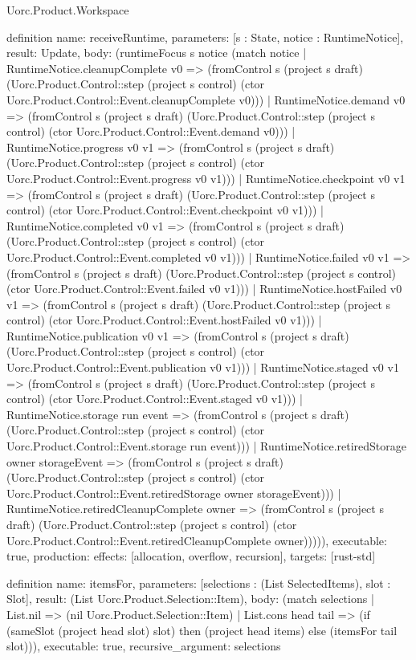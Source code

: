 \begin{lexlean}{Uorc.Product.Workspace}
\begin{semanticmodule}
definition{
  name: receiveRuntime,
  parameters: [s : State, notice : RuntimeNotice],
  result: Update,
  body: (runtimeFocus s notice (match notice
    | RuntimeNotice.cleanupComplete v0 => (fromControl s (project s draft) (Uorc.Product.Control::step (project s control) (ctor Uorc.Product.Control::Event.cleanupComplete v0)))
    | RuntimeNotice.demand v0 => (fromControl s (project s draft) (Uorc.Product.Control::step (project s control) (ctor Uorc.Product.Control::Event.demand v0)))
    | RuntimeNotice.progress v0 v1 => (fromControl s (project s draft) (Uorc.Product.Control::step (project s control) (ctor Uorc.Product.Control::Event.progress v0 v1)))
    | RuntimeNotice.checkpoint v0 v1 => (fromControl s (project s draft) (Uorc.Product.Control::step (project s control) (ctor Uorc.Product.Control::Event.checkpoint v0 v1)))
    | RuntimeNotice.completed v0 v1 => (fromControl s (project s draft) (Uorc.Product.Control::step (project s control) (ctor Uorc.Product.Control::Event.completed v0 v1)))
    | RuntimeNotice.failed v0 v1 => (fromControl s (project s draft) (Uorc.Product.Control::step (project s control) (ctor Uorc.Product.Control::Event.failed v0 v1)))
    | RuntimeNotice.hostFailed v0 v1 => (fromControl s (project s draft) (Uorc.Product.Control::step (project s control) (ctor Uorc.Product.Control::Event.hostFailed v0 v1)))
    | RuntimeNotice.publication v0 v1 => (fromControl s (project s draft) (Uorc.Product.Control::step (project s control) (ctor Uorc.Product.Control::Event.publication v0 v1)))
    | RuntimeNotice.staged v0 v1 => (fromControl s (project s draft) (Uorc.Product.Control::step (project s control) (ctor Uorc.Product.Control::Event.staged v0 v1)))
    | RuntimeNotice.storage run event => (fromControl s (project s draft) (Uorc.Product.Control::step (project s control) (ctor Uorc.Product.Control::Event.storage run event)))
    | RuntimeNotice.retiredStorage owner storageEvent => (fromControl s (project s draft) (Uorc.Product.Control::step (project s control) (ctor Uorc.Product.Control::Event.retiredStorage owner storageEvent)))
    | RuntimeNotice.retiredCleanupComplete owner => (fromControl s (project s draft) (Uorc.Product.Control::step (project s control) (ctor Uorc.Product.Control::Event.retiredCleanupComplete owner))))),
  executable: true,
  production: {effects: [allocation, overflow, recursion], targets: [rust-std]}
}

definition{
  name: itemsFor,
  parameters: [selections : (List SelectedItems), slot : Slot],
  result: (List Uorc.Product.Selection::Item),
  body: (match selections
    | List.nil => (nil Uorc.Product.Selection::Item)
    | List.cons head tail => (if (sameSlot (project head slot) slot) then (project head items) else (itemsFor tail slot))),
  executable: true,
  recursive_argument: selections
}


\end{semanticmodule}
\end{lexlean}
